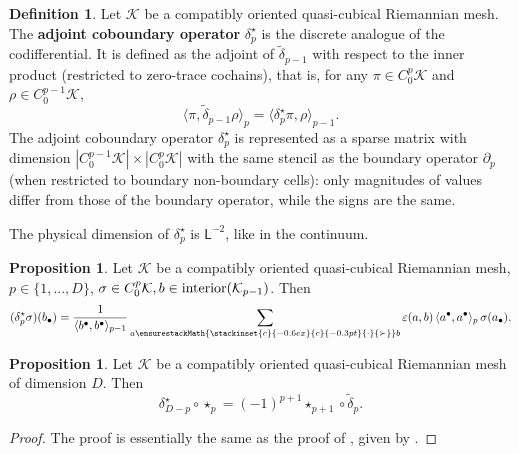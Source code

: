 \documentclass{elsarticle}
\theoremstyle{definition}
\newtheorem{proposition}[theorem]{Proposition}
\newtheorem{definition}[theorem]{Definition}
\newcommand{\abs}[1]{\left\lvert#1\right\rvert}
\newcommand{\inner}[2]{\langle#1,#2\rangle}
\newcommand{\succdot}{%
  \mathrel{%
    \ensurestackMath{%
      \stackinset{c}{-0.6ex}{c}{-0.3pt}{\cdot}{\succ}%
    }%
  }%
}
\newcommand{\newterm}[1]{\textbf{#1}}
\newcommand{\length}{\mathsf{L}}
\begin{document}
\begin{definition}
  Let $\mathcal{K}$ be a compatibly oriented quasi-cubical Riemannian mesh.
  The \newterm{adjoint coboundary operator} $\delta^\star_p$ is the discrete analogue of the codifferential.
  It is defined as the adjoint of $\tilde{\delta}_{p - 1}$ with respect to the inner product (restricted to zero-trace cochains),
  that is, for any $\pi \in C^p_0 \mathcal{K}$ and $\rho \in C^{p - 1}_0 \mathcal{K}$,
  \begin{equation}
    \inner{\pi}{\tilde{\delta}_{p - 1} \rho}_p = \inner{\delta^\star_p \pi}{\rho}_{p - 1}.
  \end{equation}
  The adjoint coboundary operator $\delta^\star_p$ is represented as a sparse matrix with dimension $\abs{C^{p - 1}_0 \mathcal{K}} \times \abs{C^p_0 \mathcal{K}}$ with the same stencil as the boundary operator $\partial_p$ (when restricted to boundary non-boundary cells): only magnitudes of values differ from those of the boundary operator, while the signs are the same.

  The physical dimension of $\delta^\star_p$ is $\length^{-2}$, like in the continuum.
\end{definition}
\begin{proposition}
  Let $\mathcal{K}$ be a compatibly oriented quasi-cubical Riemannian mesh,
  $p \in \{1, ..., D\}$,
  $\sigma \in C^p_0 \mathcal{K}, b \in {\rm interior}(\mathcal{K}_{p - 1})$.
  Then \cite[Equation 14]{berbatov2022diffusion}
  \begin{equation}
    (\delta^\star_p \sigma)(b_\bullet) = \frac{1}{\inner{b^\bullet}{b^\bullet}_{p - 1}} \sum_{a \succdot b} \varepsilon(a, b)\, \inner{a^\bullet}{a^\bullet}_p\, \sigma(a_\bullet).
  \end{equation}
\end{proposition}
\begin{proposition}
  Let $\mathcal{K}$ be a compatibly oriented quasi-cubical Riemannian mesh of dimension $D$.
  Then
  \begin{equation}
    \delta^\star_{D - p} \circ \star_p = (-1)^{p + 1} \star_{p + 1} \circ \tilde{\delta}_p.
  \end{equation}
\end{proposition}
\begin{proof}
  The proof is essentially the same as the proof of , given by .
\end{proof}
\end{document}
